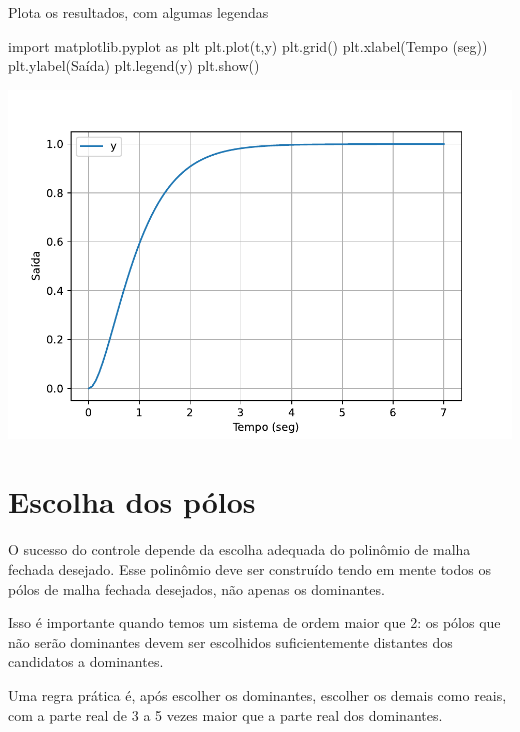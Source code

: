 \documentclass[
]{book}
\newenvironment{Shaded}{\begin{snugshade}}{\end{snugshade}}
\newcommand{\ImportTok}[1]{#1}
\newcommand{\NormalTok}[1]{#1}
\newcommand{\StringTok}[1]{\textcolor[rgb]{0.31,0.60,0.02}{#1}}
\begin{document}
Plota os resultados, com algumas legendas

\begin{Shaded}
\begin{Highlighting}[]
\ImportTok{import}\NormalTok{ matplotlib.pyplot }\ImportTok{as}\NormalTok{ plt}
\NormalTok{plt.plot(t,y)}
\NormalTok{plt.grid()}
\NormalTok{plt.xlabel(}\StringTok{\textquotesingle{}Tempo (seg)\textquotesingle{}}\NormalTok{)}
\NormalTok{plt.ylabel(}\StringTok{\textquotesingle{}Saída\textquotesingle{}}\NormalTok{)}
\NormalTok{plt.legend(}\StringTok{\textquotesingle{}y\textquotesingle{}}\NormalTok{)}
\NormalTok{plt.show()}
\end{Highlighting}
\end{Shaded}

\includegraphics{_main_files/figure-latex/unnamed-chunk-34-1.pdf}

\hypertarget{escolha-dos-puxf3los}{%
\section{Escolha dos pólos}\label{escolha-dos-puxf3los}}

O sucesso do controle depende da escolha adequada do polinômio de malha fechada desejado. Esse polinômio deve ser construído tendo em mente todos os pólos de malha fechada desejados, não
apenas os dominantes.

Isso é importante quando temos um sistema de ordem maior que 2: os pólos que não serão dominantes devem ser escolhidos suficientemente distantes dos candidatos a dominantes.

Uma regra prática é, após escolher os dominantes, escolher os demais como reais, com a parte real de 3 a 5 vezes maior que a parte real dos dominantes.
\end{document}
